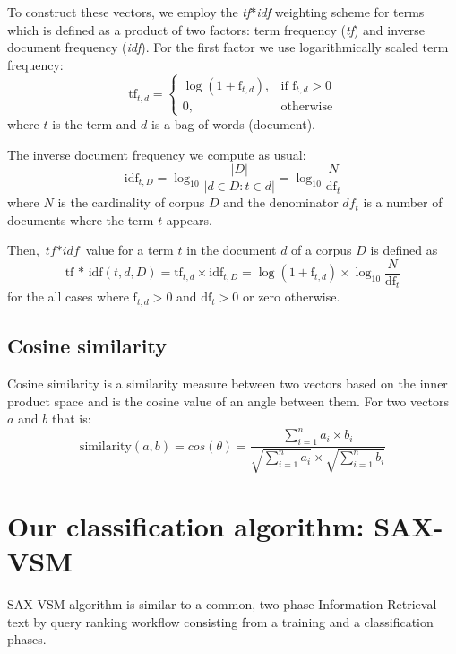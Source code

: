\documentclass{llncs}
\begin{document}
To construct these vectors, we employ the \textit{tf$\ast$idf} weighting scheme for terms which is
defined as a product of two factors: term frequency (\textit{tf}) and inverse document frequency
(\textit{idf}). For the first factor we use logarithmically scaled term frequency:
\begin{equation}
 \mbox{tf}_{t, d} =  \begin{cases} \log(1 + \mbox{f}_{t,d}), &\mbox{if f}_{t,d}>0  \\
0, & \mbox{otherwise} \end{cases}
\end{equation} 
where $t$ is the term and $d$ is a bag of words (document).

The inverse document frequency we compute as usual:
\begin{equation}
 \mbox{idf}_{t, D} =  \log_{10}\frac{|D|}{|d \in D : t \in d|} = \log_{10}\frac{N}{\mbox{df}_{t}}
\end{equation} 
where $N$ is the cardinality of corpus $D$ and the denominator $df_{t}$ is a number of documents
where the term $t$ appears.

Then, $\textit{tf$\ast$idf}$ value for a term $t$ in the document $d$ of a corpus $D$ is defined as 
\begin{equation}
 \mbox{tf * idf}(t, d, D) =  \mbox{tf}_{t, d} \times \mbox{idf}_{t, D} = \log(1 + \mbox{f}_{t,d})
\times \log_{10}\frac{N}{\mbox{df}_{t}}
\end{equation} 
for the all cases where $\mbox{f}_{t,d}>0$ and $\mbox{df}_{t}>0$ or zero otherwise.

\subsection{Cosine similarity}
Cosine similarity is a similarity measure between two vectors based on the inner product space
and is the cosine value of an angle between them. For two vectors $a$ and $b$ that is:
\begin{equation}
 \mbox{similarity}(a,b) = cos(\theta) = \frac{ \sum\limits^{n}_{i=1} a_{i} \times b_{i} }{
\sqrt{\sum\limits^{n}_{i=1} a_{i}} \times \sqrt{\sum\limits^{n}_{i=1} b_{i}} }
\end{equation} 


\section{Our classification algorithm: SAX-VSM}
SAX-VSM algorithm is similar to a common, two-phase Information Retrieval text by query ranking
workflow consisting from a training and a classification phases. 
\end{document}
